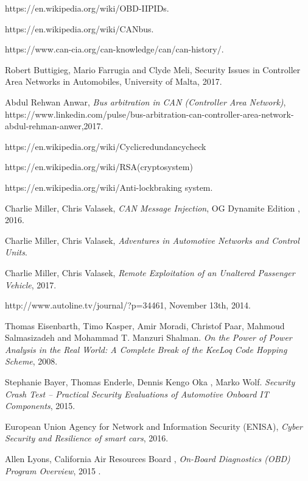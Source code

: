 \documentclass[11pt]{article}
\begin{document}
\begin{thebibliography}{10}
	https://en.wikipedia.org/wiki/OBD-II\textunderscore PIDs.
	
	https://en.wikipedia.org/wiki/CAN\textunderscore bus.
	
	https://www.can-cia.org/can-knowledge/can/can-history/.
	
	Robert Buttigieg, Mario Farrugia and Clyde Meli, Security Issues in Controller Area Networks in Automobiles, University of Malta, 2017.
	
	Abdul Rehwan Anwar, \textit{Bus arbitration in CAN (Controller Area Network)}, https://www.linkedin.com/pulse/bus-arbitration-can-controller-area-network-abdul-rehman-anwer,2017.
	
	https://en.wikipedia.org/wiki/Cyclic\textunderscore redundancy\textunderscore check
	
	https://en.wikipedia.org/wiki/RSA\textunderscore (cryptosystem)
	
	https://en.wikipedia.org/wiki/Anti-lock\textunderscore braking \textunderscore system.
	
	Charlie Miller, Chris Valasek,
	\textit{CAN Message Injection},
	OG Dynamite Edition
	, 2016.

	Charlie Miller, Chris Valasek,
	\textit{Adventures in Automotive Networks and Control Units}.
	
	Charlie Miller, Chris Valasek,
	\textit{Remote Exploitation of an Unaltered Passenger Vehicle}, 2017.
	
	http://www.autoline.tv/journal/?p=34461, November 13th, 2014.
	
	Thomas Eisenbarth, Timo Kasper, Amir Moradi, Christof Paar, Mahmoud Salmasizadeh and Mohammad T. Manzuri Shalman.
	\textit{On the Power of Power Analysis in the Real World: A Complete Break of the KeeLoq Code Hopping Scheme}, 2008.
	
	Stephanie Bayer, Thomas Enderle, Dennis Kengo Oka , Marko Wolf.
	\textit{Security Crash Test – Practical Security Evaluations of Automotive Onboard IT Components}, 2015.
	
	European Union Agency for Network and Information Security (ENISA),
	\textit{Cyber Security and Resilience of smart cars},
	2016.
	
	Allen Lyons, California Air Resources Board ,
	\textit{On-Board Diagnostics (OBD) Program Overview},
	2015 .
	

\end{thebibliography}
\end{document}
